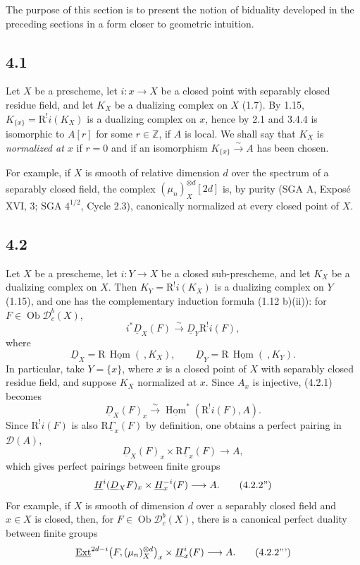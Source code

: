 \documentclass[11pt]{article}
\theoremstyle{plain}
\theoremstyle{definition}
\theoremstyle{remark}
\newcommand{\ZZ}{\mathbb Z}
\newcommand{\D}{\mathcal D}\newcommand{\E}{\mathcal E}\newcommand{\F}{\mathcal F}
\DeclareMathOperator{\Hom}{Hom}
\DeclareMathOperator{\ob}{Ob}
\newcommand{\R}{\mathrm R}
\begin{document}
The purpose of this section is to present the notion of biduality developed in the preceding sections in a form closer to geometric intuition.

\subsection*{4.1}
Let $X$ be a prescheme, let $i:x\to X$ be a closed point with separably closed residue field, and let $K_X$ be a dualizing complex on $X$ (1.7). By 1.15, $K_{\{x\}}=\R^!i(K_X)$ is a dualizing complex on $x$, hence by 2.1 and 3.4.4 is isomorphic to $A[r]$ for some $r\in\ZZ$, if $A$ is local. We shall say that $K_X$ is \emph{normalized at $x$} if $r=0$ and if an isomorphism $K_{\{x\}}\xrightarrow{\sim}A$ has been chosen.

For example, if $X$ is smooth of relative dimension $d$ over the spectrum of a separably closed field, the complex $(\mu_n)_X^{\otimes d}[2d]$ is, by purity (SGA A, Exposé XVI, 3; SGA $4^{1/2}$, Cycle 2.3), canonically normalized at every closed point of $X$.

\subsection*{4.2}
Let $X$ be a prescheme, let $i:Y\to X$ be a closed sub-prescheme, and let $K_X$ be a dualizing complex on $X$. Then $K_Y=\R^!i(K_X)$ is a dualizing complex on $Y$ (1.15), and one has the complementary induction formula (1.12 b)(ii)): for $F\in\ob\D_c^b(X)$,
\[
   i^*\underline D_X(F)\xrightarrow{\sim}\underline D_Y\R^!i(F),\tag{4.2.1}
\]
where
\[
   \underline D_X=\R\,\underline{\Hom}(\ ,K_X),\qquad
   \underline D_Y=\R\,\underline{\Hom}(\ ,K_Y).
\]
In particular, take $Y=\{x\}$, where $x$ is a closed point of $X$ with separably closed residue field, and suppose $K_X$ normalized at $x$. Since $A_x$ is injective, (4.2.1) becomes
\[
   \underline D_X(F)_x\xrightarrow{\sim}\underline{\Hom}^*(\R^!i(F),A).\tag{4.2.2}
\]
Since $\R^!i(F)$ is also $\R\underline\Gamma_x(F)$ by definition, one obtains a perfect pairing in $\D(A)$,
\[
   \underline D_X(F)_x\times \R\underline\Gamma_x(F)\longrightarrow A,\tag{4.2.2'}
\]
which gives perfect pairings between finite groups
\[
   \underline{H}^i(\underline D_XF)_x\times \underline{H}^{-i}_x(F)\longrightarrow A.\tag{4.2.2''}
\]
For example, if $X$ is smooth of dimension $d$ over a separably closed field and $x\in X$ is closed, then, for $F\in\ob\D_c^b(X)$, there is a canonical perfect duality between finite groups
\[
   \underline{\operatorname{Ext}}^{2d-i}\bigl(F,(\mu_n)_X^{\otimes d}\bigr)_x
      \times \underline{H}^i_x(F)\longrightarrow A.\tag{4.2.2'''}
\]
\end{document}
